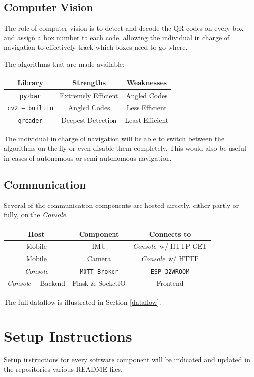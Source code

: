 \documentclass[a4paper,12pt]{article}
\newcommand{\esp}{\texttt{ESP-32WROOM}}
\newcommand{\con}{\textit{Console}}
\begin{document}
\subsection{Computer Vision}
The role of computer vision is to detect and decode the QR codes on every box and assign a box number to each code, allowing the individual in charge of navigation to effectively track which boxes need to go where.

The algorithms that are made available:
\begin{center}
    \bgroup
    \def\arraystretch{1.5}
    {
    \begin{tabular}{|c|c|c|}
        \hline
        \textbf{Library} & \textbf{Strengths} & \textbf{Weaknesses} \\
        \hline
        \texttt{pyzbar} & Extremely Efficient & Angled Codes \\
        \hline
        \texttt{cv2 -- builtin} & Angled Codes & Less Efficient \\
        \hline
        \texttt{qreader} & Deepest Detection & Least Efficient \\
        \hline
    \end{tabular}}
    \egroup
\end{center}
The individual in charge of navigation will be able to switch between the algorithms on-the-fly or even disable them completely. This would also be useful in cases of autonomous or semi-autonomous navigation.
\subsection{Communication}
Several of the communication components are hosted directly, either partly or fully, on the \con.
\begin{center}
    \bgroup
    \def\arraystretch{1.5}
    {
    \begin{tabular}{|c|c|c|}
        \hline
        \textbf{Host} & \textbf{Component} & \textbf{Connects to} \\
        \hline
        Mobile & IMU & \con\ w/ HTTP GET \\
        \hline
        Mobile & Camera & \con\ w/ HTTP \\
        \hline
        \con & \texttt{MQTT Broker} & \esp \\
        \hline
        \con\ -- Backend & Flask \& SocketIO & Frontend \\
        \hline
    \end{tabular}}
    \egroup
\end{center}
The full dataflow is illustrated in Section \ref{dataflow}.
\section{Setup Instructions}
Setup instructions for every software component will be indicated and updated in the repositories various README files.
\end{document}
